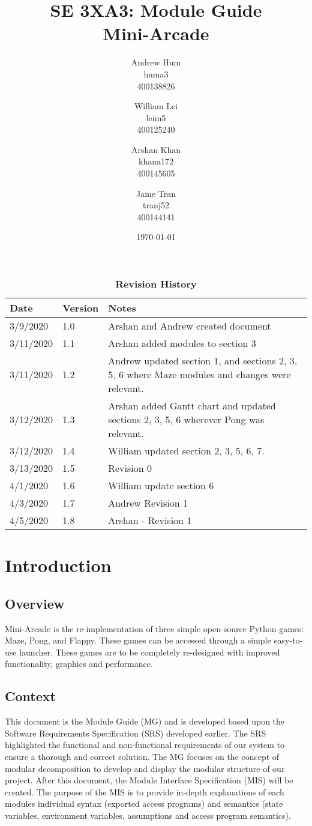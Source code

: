 \documentclass[12pt, titlepage]{article}
\title{SE 3XA3: Module Guide\\Mini-Arcade}
\author{Andrew Hum \\ huma3 \\ 400138826 \and
		William Lei \\ leim5 \\ 400125240 \and
		Arshan Khan \\ khana172 \\ 400145605 \and
		Jame Tran \\ tranj52 \\ 400144141
}
\date{\today}
\begin{document}
\maketitle

\tableofcontents
\listoftables
\listoffigures

\begin{table}[H]
\caption{\bf Revision History}
\begin{tabularx}{\textwidth}{p{3cm}p{2cm}X}
\toprule {\bf Date} & {\bf Version} & {\bf Notes}\\
\midrule
3/9/2020 & 1.0 & Arshan and Andrew created document\\
3/11/2020 & 1.1 & Arshan added modules to section 3\\
3/11/2020 & 1.2 & Andrew updated section 1, and sections 2, 3, 5, 6 where Maze modules and changes were relevant.\\
3/12/2020 & 1.3 & Arshan added Gantt chart and updated sections 2, 3, 5, 6 wherever Pong was relevant.\\
3/12/2020 & 1.4 & William updated section 2, 3, 5, 6, 7.\\
3/13/2020 & 1.5 & Revision 0\\
4/1/2020 & 1.6 & William update section 6 \\
4/3/2020 & 1.7 & Andrew Revision 1 \\
4/5/2020 & 1.8 & Arshan - Revision 1\\
\bottomrule
\end{tabularx}
\end{table}


\newpage


\section{Introduction}
\subsection{Overview}
Mini-Arcade is the re-implementation of three simple open-source Python games: Maze, Pong, and Flappy. These games can be accessed through a simple easy-to-use launcher. These games are to be completely re-designed with improved functionality, graphics and performance.
\subsection{Context}
This document is the Module Guide (MG) and is developed based upon the Software Requirements Specification (SRS) developed earlier. The SRS highlighted the functional and non-functional requirements of our system to ensure a thorough and correct solution. The MG focuses on the concept of modular decomposition to develop and display the modular structure of our project. After this document, the Module Interface Specification (MIS) will be created. The purpose of the MIS is to provide in-depth explanations of each modules individual syntax (exported access programs) and semantics (state variables, environment variables, assumptions and access program semantics).
\end{document}

